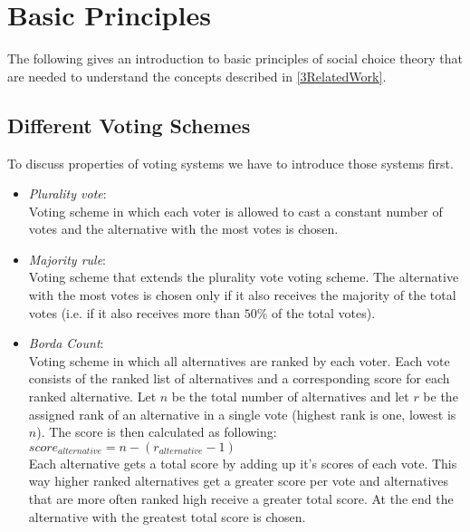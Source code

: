 \documentclass[conference]{IEEEtran}
\begin{document}
\section{Basic Principles}\label{2BasicPrinciples}
The following gives an introduction to basic principles of social choice theory that are needed to understand the concepts described in \ref{3RelatedWork}.
\subsection{Different Voting Schemes}
To discuss properties of voting systems we have to introduce those systems first.
\begin{itemize}
    \item \textit{Plurality vote}:\\
    Voting scheme in which each voter is allowed to cast a constant number of votes and the alternative with the most votes is chosen.

    \item \textit{Majority rule}:\\
    Voting scheme that extends the plurality vote voting scheme. The alternative with the most votes is chosen only if it also receives the majority of the total votes (i.e. if it also receives more than $50\%$ of the total votes).

    \item \textit{Borda Count}:\\
    Voting scheme in which all alternatives are ranked by each voter. Each vote consists of the ranked list of alternatives and a corresponding score for each ranked alternative. Let $n$ be the total number of alternatives and let $r$ be the assigned rank of an alternative in a single vote (highest rank is one, lowest is $n$). The score is then calculated as following:\\
    $score_{alternative}=n-(r_{alternative}-1)$\\
    Each alternative gets a total score by adding up it's scores of each vote. This way higher ranked alternatives get a greater score per vote and alternatives that are more often ranked high receive a greater total score. At the end the alternative with the greatest total score is chosen.
\end{itemize}

\end{document}
